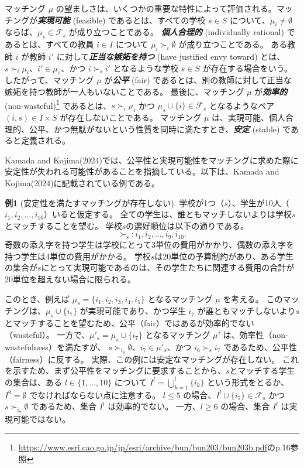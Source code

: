 \documentclass[12pt, a4paper]{article}
\theoremstyle{definition}
\theoremstyle{remark}
\theoremstyle{plain}
\begin{document}
マッチング $\mu$ の望ましさは、いくつかの重要な特性によって評価される。マッチングが\textbf{\textit{実現可能}} (feasible) であるとは、すべての学校 $s \in S$ について、$\mu_i \neq \emptyset$ならば、$\mu_s \in \mathcal{F}_s$ が成り立つことである。
\textbf{\textit{個人合理的}} (individually rational) であるとは、すべての教員 $i \in I$ について $\mu_i \succ_i \emptyset$ が成り立つことである。
ある教師 $i$ が教師 $i'$ に対して\textbf{\textit{正当な嫉妬を持つ}} (have justified envy toward) とは、$s \succ_i \mu_i$、$i' \in \mu_s$、かつ $i \succ_s i'$ となるような学校 $s \in S$ が存在する場合をいう。
したがって、マッチング $\mu$ が\textbf{\textit{公平}} (fair) であるとは、別の教師に対して正当な嫉妬を持つ教師が一人もいないことである。
最後に、マッチング $\mu$ が\textbf{\textit{効率的}} (non-wasteful)\footnote{\url{https://www.esri.cao.go.jp/jp/esri/archive/bun/bun203/bun203b.pdf}のp.16参照} であるとは、$s \succ_i \mu_i$ かつ $\mu_s \cup \{i\} \in \mathcal{F}_s$ となるようなペア $(i, s) \in I \times S$ が存在しないことである。
マッチング $\mu$ は、実現可能、個人合理的、公平、かつ無駄がないという性質を同時に満たすとき、\textbf{\textit{安定}} (stable) であると定義される。

Kamada and Kojima(2024)では、公平性と実現可能性をマッチングに求めた際に安定性が失われる可能性があることを指摘している。以下は、Kamada and Kojima(2024)に記載されている例である。

\textbf{例1} (安定性を満たすマッチングが存在しない). 
学校が1つ（$s$）、学生が10人（$i_1, i_2, \dots, i_{10}$）いると仮定する。
全ての学生は、誰ともマッチしないよりは学校$s$とマッチすることを望む。
学校$s$の選好順位は以下の通りである。
\[
    \succ_s: i_1, i_2, \dots, i_9, i_{10}.
\]
奇数の添え字を持つ学生は学校にとって3単位の費用がかかり、偶数の添え字を持つ学生は4単位の費用がかかる。
学校$s$は20単位の予算制約があり、ある学生の集合が$s$にとって実現可能であるのは、その学生たちに関連する費用の合計が20単位を超えない場合に限られる。

このとき、例えば $\mu_s = \{i_1, i_2, i_3, i_4, i_5\}$ となるマッチング $\mu$ を考える。
このマッチングは、$\mu_s \cup \{i_7\}$ が実現可能であり、かつ学生 $i_7$ が誰ともマッチしないより$s$とマッチすることを望むため、公平（fair）ではあるが効率的でない（wasteful）。
一方で、$\mu'_s = \mu_s \cup \{i_7\}$ となるマッチング $\mu'$ は、効率性（non-wastefulness）を満たすが、
$s \succ_{i_6} \emptyset$、$i_7 \in \mu'_s$、かつ $i_6 \succ_s i_7$ であるため、公平性（fairness）に反する。
実際、この例には安定なマッチングが存在しない。
これを示すため、まず公平性をマッチングに要求することから、$s$とマッチする学生の集合は、ある $l \in \{1, \dots, 10\}$ について $I^l = \bigcup_{k=1}^l\{i_k\}$ という形式をとるか、$I^0 = \emptyset$ でなければならない点に注意する。
$l \le 5$ の場合、$I^l \cup \{i_7\} \in \mathcal{F}_s$ かつ $s \succ_{i_7} \emptyset$ であるため、集合 $I^l$ は効率的でない。
一方、$l \ge 6$ の場合、集合 $I^l$ は実現可能ではない。
\end{document}
